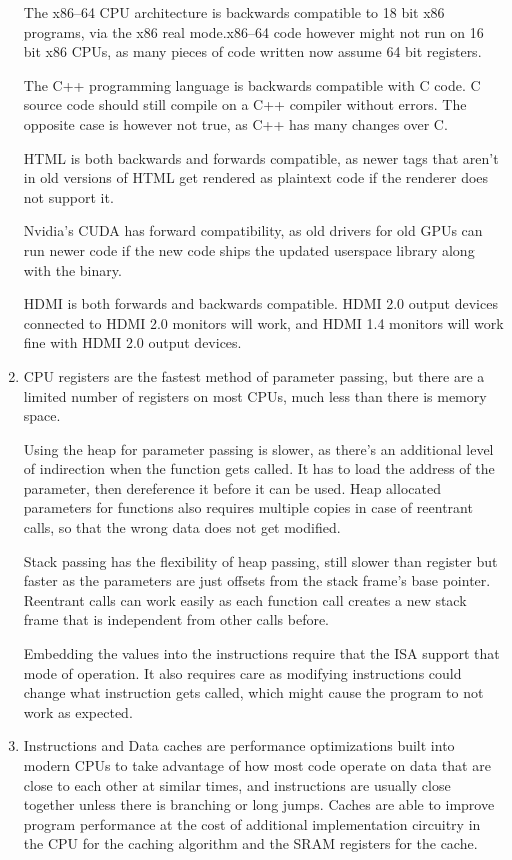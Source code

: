 \documentclass{article}
\begin{document}
\begin{enumerate}
        The x86--64 CPU architecture is backwards compatible to 18 bit x86 programs, via the x86 real mode.\@ x86--64 code however might not run on 16 bit x86 CPUs, as many pieces of code written now assume 64 bit registers.

        The C++ programming language is backwards compatible with C code. C source code should still compile on a C++ compiler without errors. The opposite case is however not true, as C++ has many changes over C.

        HTML is both backwards and forwards compatible, as newer tags that aren't in old versions of HTML get rendered as plaintext code if the renderer does not support it.

        Nvidia's CUDA has forward compatibility, as old drivers for old GPUs can run newer code if the new code ships the updated userspace library along with the binary.

        HDMI is both forwards and backwards compatible. HDMI 2.0 output devices connected to HDMI 2.0 monitors will work, and HDMI 1.4 monitors will work fine with HDMI 2.0 output devices.

  \item CPU registers are the fastest method of parameter passing, but there are a limited number of registers on most CPUs, much less than there is memory space.

        Using the heap for parameter passing is slower, as there's an additional level of indirection when the function gets called. It has to load the address of the parameter, then dereference it before it can be used. Heap allocated parameters for functions also requires multiple copies in case of reentrant calls, so that the wrong data does not get modified.

        Stack passing has the flexibility of heap passing, still slower than register but faster as the parameters are just offsets from the stack frame's base pointer. Reentrant calls can work easily as each function call creates a new stack frame that is independent from other calls before.

        Embedding the values into the instructions require that the ISA support that mode of operation. It also requires care as modifying instructions could change what instruction gets called, which might cause the program to not work as expected.

  \item Instructions and Data caches are performance optimizations built into modern CPUs to take advantage of how most code operate on data that are close to each other at similar times, and instructions are usually close together unless there is branching or long jumps. Caches are able to improve program performance at the cost of additional implementation circuitry in the CPU for the caching algorithm and the SRAM registers for the cache.


\end{enumerate}
\end{document}
